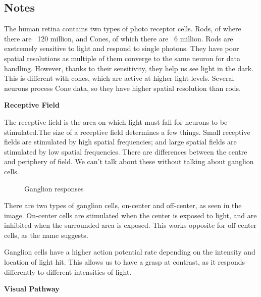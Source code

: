 \subsection{Notes}
The human retina contains two types of photo receptor cells. Rods, of where there are ~120 million, and Cones, of which there are ~6 million. Rods are exetremely sensitive to light and respond to single photons. They have poor spatial resolutions as multiple of them converge to the same neuron for data handling. However, thanks to their sensitivity, they help us see light in the dark.
This is different with cones, which are active at higher light levels. Several neurons process Cone data, so they have higher spatial resolution than rods.

\textbf{Receptive Field}

The receptive field is the area on which light must fall for neurons to be stimulated.The size of a receptive field determines a few things. Small receptive fields are stimulated by high spatial frequencies; and large spatial fields are stimulated by low spatial frequencies.  There are differences between the centre and periphery of field. We can't talk about these without talking about ganglion cells.
\begin{figure}[!htb]
	\caption{\label{fig:lens} Ganglion responses}
\end{figure}
There are two types of ganglion cells, on-center and off-center, as seen in the image. On-center cells are stimulated when the center is exposed to light, and are inhibited when the surrounded area is exposed. This works opposite for off-center cells, as the name suggests.

Ganglion cells have a higher action potential rate depending on the intensity and location of light hit. This allows us to have a grasp at contrast, as it responds differently to different intensities of light.

\textbf{Visual Pathway}

